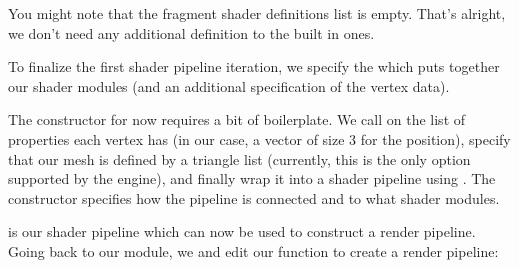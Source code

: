You might note that the fragment shader definitions list is empty. That's
alright, we don't need any additional definition to the built in ones.

To finalize the first shader pipeline iteration, we specify the 
which puts together our shader modules (and an additional specification of the
vertex data).

\resethooks

The  constructor for now requires a bit of boilerplate. We call
 on the list of properties each vertex has (in our case, a vector
of size 3 for the position), specify that our mesh is defined by a triangle list
(currently, this is the only option supported by the engine), and finally wrap
it into a shader pipeline using . The  constructor
specifies how the pipeline is connected and to what shader modules.

 is our shader pipeline which can now be used to construct
a render pipeline. Going back to our  module, we  and
edit our  function to create a render pipeline:

\begin{hscode}\SaveRestoreHook
\ColumnHook
\end{hscode}\resethooks

